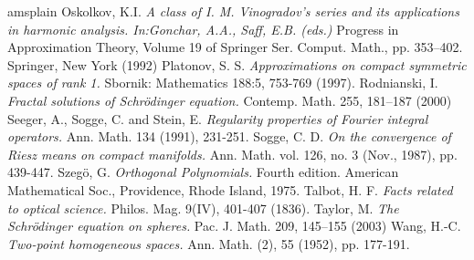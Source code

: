 \documentclass[12pt]{amsart}
\theoremstyle{definition}
\numberwithin{equation}{section}
\begin{document}
\begin{thebibliography}{amsplain}
Oskolkov, K.I. {\em A class of I. M. Vinogradov’s series and its applications in harmonic analysis. In:Gonchar, A.A., Saff, E.B. (eds.)} Progress in Approximation Theory, Volume 19 of Springer Ser. Comput. Math., pp. 353–402. Springer, New York (1992)
 Platonov, S. S. {\em Approximations on compact symmetric spaces of rank 1.} Sbornik: Mathematics 188:5, 753-769 (1997).
 Rodnianski, I. {\em Fractal solutions of Schrödinger equation.} Contemp. Math. 255, 181–187 (2000)
 Seeger, A., Sogge, C. and Stein, E. {\em Regularity properties of Fourier integral operators.} Ann. Math. 134 (1991), 231-251.
 Sogge, C. D. {\em On the convergence of Riesz means on compact manifolds.} Ann. Math. vol. 126, no. 3 (Nov., 1987), pp. 439-447.
 Szeg\"o, G. {\em Orthogonal Polynomials.} Fourth edition. American Mathematical Soc., Providence, Rhode Island, 1975.
 Talbot, H. F. {\em Facts related to optical science.} Philos. Mag. 9(IV), 401-407 (1836).
 Taylor, M. {\em The Schr\"odinger equation on spheres.} Pac. J. Math. 209, 145–155 (2003)
 Wang, H.-C. {\em Two-point homogeneous spaces.} Ann. Math. (2), 55 (1952), pp. 177-191.



\end{thebibliography}
\end{document}
